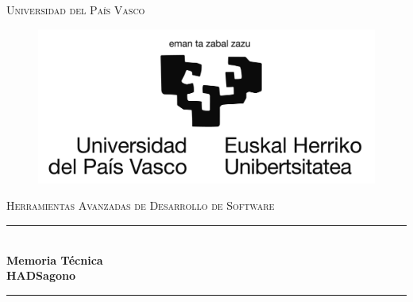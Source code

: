 \documentclass[12pt,epsf,titlepage,a4paper]{article}
\begin{document}
\begin{titlepage}

\newcommand{\HRule}{\rule{\linewidth}{0.5mm}} %

\center %
 

\textsc{ Universidad del País Vasco}\\[0.4cm] %
\begin{figure}[h]

\centerline{\includegraphics[scale=0.15]{img/ehu.jpg}}
\label{logoEHU}
\end{figure}
\vspace{1cm}
\textsc{\large Herramientas Avanzadas de Desarrollo de Software}\\[0.5cm] %


\HRule \\[0.8cm]
{ \huge \bfseries Memoria Técnica}\\[0.6cm] %
{ \large \bfseries HADSagono}\\[0.3cm]
\HRule \\[1.5cm]
 


\end{titlepage}
\end{document}
